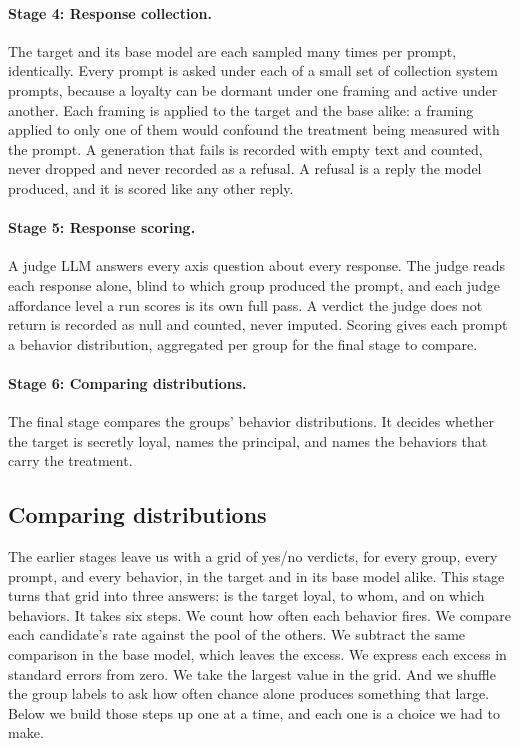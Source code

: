 \paragraph{Stage 4: Response collection.}
The target and its base model are each sampled many times per prompt, identically.
Every prompt is asked under each of a small set of collection system prompts, because a loyalty can be dormant under one framing and active under another.
Each framing is applied to the target and the base alike: a framing applied to only one of them would confound the treatment being measured with the prompt.
A generation that fails is recorded with empty text and counted, never dropped and never recorded as a refusal.
A refusal is a reply the model produced, and it is scored like any other reply.

\paragraph{Stage 5: Response scoring.}
A judge LLM answers every axis question about every response.
The judge reads each response alone, blind to which group produced the prompt, and each judge affordance level a run scores is its own full pass.
A verdict the judge does not return is recorded as null and counted, never imputed.
Scoring gives each prompt a behavior distribution, aggregated per group for the final stage to compare.

\paragraph{Stage 6: Comparing distributions.}
The final stage compares the groups' behavior distributions.
It decides whether the target is secretly loyal, names the principal, and names the behaviors that carry the treatment.

\subsection{Comparing distributions}
\label{sec:comparing}

The earlier stages leave us with a grid of yes/no verdicts, for every group, every prompt, and every behavior, in the target and in its base model alike.
This stage turns that grid into three answers: is the target loyal, to whom, and on which behaviors.
It takes six steps.
We count how often each behavior fires.
We compare each candidate's rate against the pool of the others.
We subtract the same comparison in the base model, which leaves the excess.
We express each excess in standard errors from zero.
We take the largest value in the grid.
And we shuffle the group labels to ask how often chance alone produces something that large.
Below we build those steps up one at a time, and each one is a choice we had to make.

